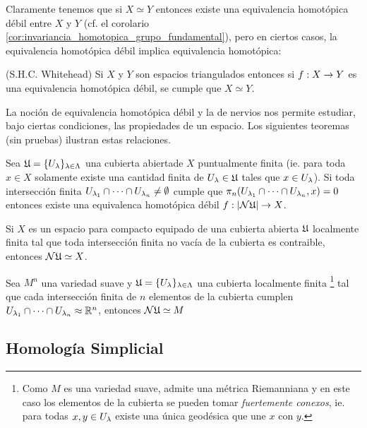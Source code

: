 \documentclass[../../topologia_algebraica]{subfiles}
\begin{document}
Claramente tenemos que si $X\simeq Y$ entonces existe una equivalencia homot\'opica d\'ebil entre $X$ y
$Y$ (cf. el corolario \ref{cor:invariancia_homotopica_grupo_fundamental}), pero en ciertos casos, la equivalencia
homot\'opica d\'ebil implica equivalencia homot\'opica:

\begin{thm}(S.H.C. Whitehead)
  Si $X$ y $Y$ son espacios triangulados entonces si $f:X\rightarrow Y$ es una equivalencia homot\'opica d\'ebil,
  se cumple que $X\simeq Y$.
\end{thm}

La noci\'on de equivalencia homot\'opica d\'ebil y la de nervios nos permite estudiar, bajo ciertas condiciones, las
propiedades de un espacio. Los siguientes teoremas (sin pruebas) ilustran estas relaciones.

\begin{thm}
  Sea $\mathfrak{U}=\{U_{\lambda}\}_{\lambda\in\Lambda}$ una cubierta abiertade $X$ puntualmente finita (ie. para toda $x\in X$
  solamente existe una cantidad finita de $U_{\lambda}\in\mathfrak{U}$ tales que $x\in U_{\lambda}$). Si toda intersecci\'on finita
  $U_{\lambda_1}\cap\cdots\cap U_{\lambda_n}\neq \emptyset$ cumple que $\pi_n(U_{\lambda_1}\cap\cdots\cap U_{\lambda_n},x)=0$
  entonces existe una equivalenca homot\'opica d\'ebil $f:\left| \mathcal{N}\mathfrak{U} \right|\rightarrow X$.
\end{thm}

\begin{thm}
  Si $X$ es un espacio para compacto equipado de una cubierta abierta $\mathfrak{U}$ localmente
  finita tal que toda intersecci\'on finita no vac\'ia de la cubierta es contraible, entonces $\mathcal{N}\mathfrak{U}\simeq X$.
\end{thm}

\begin{thm}
  Sea $M^n$ una variedad suave y $\mathfrak{U}=\{U_{\lambda}\}_{\lambda\in\Lambda}$ una cubierta localmente finita%
  \footnote{Como $M$ es una variedad suave, admite una m\'etrica Riemanniana y en este caso los elementos de
  la cubierta se pueden tomar \emph{fuertemente conexos}, ie. para todas $x,y\in U_{\lambda}$ existe una \'unica geod\'esica
  que une $x$ con $y$.}
  tal que cada intersecci\'on finita de $n$ elementos de la cubierta cumplen
  $U_{\lambda_1}\cap\cdots\cap U_{\lambda_n}\approx\mathbb{R}^n$, entonces $\mathcal{N}\mathfrak{U}\simeq M$
\end{thm}

\subsection{Homolog\'ia Simplicial}
\end{document}
